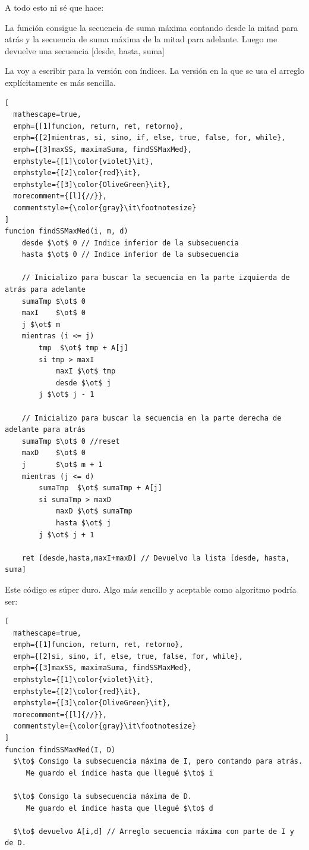 A todo esto ni sé que hace: 

La función consigue la secuencia de suma máxima contando desde la mitad para atrás y la secuencia de suma máxima de la mitad
para adelante. Luego me devuelve una secuencia [desde, hasta, suma]

La voy a escribir para la versión con índices. La versión en la que se usa el arreglo explícitamente es más sencilla.

\begin{tcolorbox}
  \begin{lstlisting}[
  mathescape=true,
  emph={[1]funcion, return, ret, retorno},
  emph={[2]mientras, si, sino, if, else, true, false, for, while},
  emph={[3]maxSS, maximaSuma, findSSMaxMed},
  emphstyle={[1]\color{violet}\it},
  emphstyle={[2]\color{red}\it},
  emphstyle={[3]\color{OliveGreen}\it},
  morecomment={[l]{//}},
  commentstyle={\color{gray}\it\footnotesize}
]
funcion findSSMaxMed(i, m, d)
    desde $\ot$ 0 // Indice inferior de la subsecuencia
    hasta $\ot$ 0 // Indice inferior de la subsecuencia

    // Inicializo para buscar la secuencia en la parte izquierda de atrás para adelante
    sumaTmp $\ot$ 0
    maxI    $\ot$ 0
    j $\ot$ m
    mientras (i <= j)
        tmp  $\ot$ tmp + A[j]
        si tmp > maxI
            maxI $\ot$ tmp
            desde $\ot$ j
        j $\ot$ j - 1

    // Inicializo para buscar la secuencia en la parte derecha de adelante para atrás
    sumaTmp $\ot$ 0 //reset
    maxD    $\ot$ 0
    j       $\ot$ m + 1
    mientras (j <= d)
        sumaTmp  $\ot$ sumaTmp + A[j]
        si sumaTmp > maxD
            maxD $\ot$ sumaTmp
            hasta $\ot$ j
        j $\ot$ j + 1

    ret [desde,hasta,maxI+maxD] // Devuelvo la lista [desde, hasta, suma] \end{lstlisting}
\end{tcolorbox}

Este código es súper duro. Algo más sencillo y aceptable como algoritmo podría ser:
\begin{tcolorbox}
  \begin{lstlisting}[
  mathescape=true,
  emph={[1]funcion, return, ret, retorno},
  emph={[2]si, sino, if, else, true, false, for, while},
  emph={[3]maxSS, maximaSuma, findSSMaxMed},
  emphstyle={[1]\color{violet}\it},
  emphstyle={[2]\color{red}\it},
  emphstyle={[3]\color{OliveGreen}\it},
  morecomment={[l]{//}},
  commentstyle={\color{gray}\it\footnotesize}
]
funcion findSSMaxMed(I, D)
  $\to$ Consigo la subsecuencia máxima de I, pero contando para atrás.
     Me guardo el índice hasta que llegué $\to$ i

  $\to$ Consigo la subsecuencia máxima de D. 
     Me guardo el índice hasta que llegué $\to$ d

  $\to$ devuelvo A[i,d] // Arreglo secuencia máxima con parte de I y de D.\end{lstlisting}
\end{tcolorbox}

